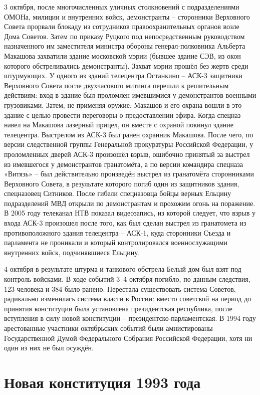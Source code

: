\documentclass[a4paper,12pt]{diss_4}
\begin{document}
3 октября, после многочисленных уличных столкновений с подразделениями ОМОНа, милиции и внутренних войск, демонстранты -- сторонники Верховного Совета прорвали блокаду из сотрудников правоохранительных органов возле Дома Советов. Затем по приказу Руцкого под непосредственным руководством назначенного им заместителя министра обороны генерал-полковника Альберта Макашова захватили здание московской мэрии (бывшее здание СЭВ, из окон которого обстреливались демонстранты). Захват мэрии прошёл без жертв среди штурмующих. У одного из зданий телецентра Останкино -- АСК-3 защитники Верховного Совета после двухчасового митинга перешли к решительным действиям: вход в здание был проломлен имевшимися у демонстрантов военными грузовиками. Затем, не применяя оружие, Макашов и его охрана вошли в это здание с целью провести переговоры о предоставлении эфира. Когда спецназ навел на Макашова лазерный прицел, он вместе с охраной покинул здание телецентра. Выстрелом из АСК-3 был ранен охранник Макашова. После чего, по версии следственной группы Генеральной прокуратуры Российской Федерации, у проломленных дверей АСК-3 произошёл взрыв, ошибочно принятый за выстрел из имевшегося у демонстрантов гранатомёта, а по версии командира спецназа «Витязь» -- был действительно произведён выстрел из гранатомёта сторонниками Верховного Совета, в результате которого погиб один из защитников здания, спецназовец Ситников. После гибели спецназовца бойцы верных Ельцину подразделений МВД открыли по демонстрантам и прохожим огонь на поражение. В 2005 году телеканал НТВ показал видеозапись, из которой следует, что взрыв у входа АСК-3 произошел после того, как был сделан выстрел из гранатомета из противоположного здания телецентра -- АСК-1, куда сторонники Съезда и парламента не проникали и который контролировался военнослужащими внутренних войск, подчинявшиеся Ельцину.

4 октября в результате штурма и танкового обстрела Белый дом был взят под контроль войсками. В ходе событий 3--4 октября погибло, по данным следствия, 123 человека и 384 было ранено. Перестала существовать система Советов, радикально изменилась система власти в России: вместо советской на период до принятия конституции была установлена президентская республика, после вступления в силу новой конституции -- президентско-парламентская. В 1994 году арестованные участники октябрьских событий были амнистированы Государственной Думой Федерального Собрания Российской Федерации, хотя ни один из них не был осуждён.

\chapter{Новая конституция 1993 года}
\end{document}
